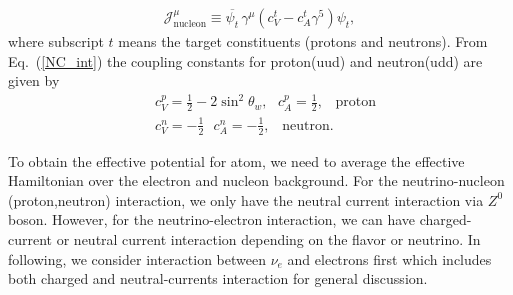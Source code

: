 \begin{align}
\label{Current_h}
\mathcal{J}^\mu_\mathrm{nucleon}\equiv\overline{\psi_t}\,\gamma^\mu\left(c^t_V-c^t_A\gamma^5\right)\psi_t,
\end{align}
where subscript $t$ means the target constituents (protons and neutrons). From Eq.~(\ref{NC_int}) the coupling constants for proton(uud) and neutron(udd) are given by
\begin{align}
&c^p_V=\frac{1}{2}-2\sin^2\theta_w,\,\,\,\,c^p_A=\frac{1}{2},\,\,\,\,\,\mathrm{proton}\\
&c^n_V=-\frac{1}{2}\,\,\,\,c^n_A=-\frac{1}{2},\,\,\,\,\,\mathrm{neutron}.
\end{align}


To obtain the effective potential for atom, we need to average the effective Hamiltonian over the electron and nucleon background. For the neutrino-nucleon (proton,neutron) interaction, we only have the neutral current interaction via $Z^0$ boson. However, for the neutrino-electron interaction, we can have charged-current or neutral current interaction depending on the flavor or neutrino. In following, we consider interaction between $\nu_e$ and electrons first which includes both charged and neutral-currents interaction for general discussion.

